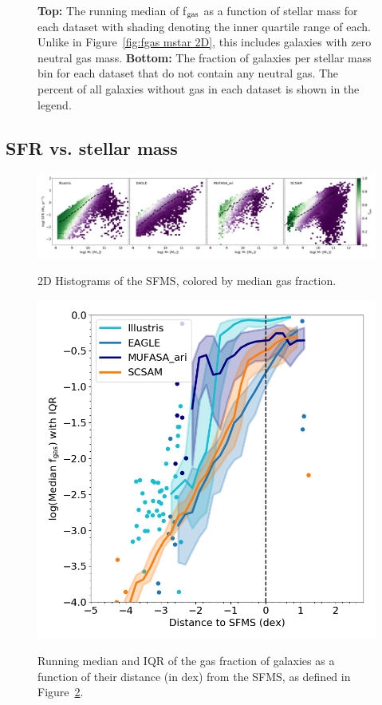 \documentclass[fleqn,usenatbib]{mnras}
\begin{document}
\begin{figure}
\caption{{\bf Top:} The running median of f$_{\rm gas}$ as a function of stellar mass for each dataset with shading denoting the inner quartile range of each. Unlike in Figure~\ref{fig:fgas mstar 2D}, this includes galaxies with zero neutral gas mass. {\bf Bottom:} The fraction of galaxies per stellar mass bin for each dataset that do not contain any neutral gas. The percent of all galaxies without gas in each dataset is shown in the legend.}
\label{fig:linear fgas mstar}
\end{figure}

\subsection{SFR vs. stellar mass}
\label{sec:results:SFMS fgas}


\begin{figure}
\includegraphics[width = 0.99\linewidth]{SFMS_fits_2dhist_median.png}\\
\caption{2D Histograms of the SFMS, colored by median gas fraction. }
\label{fig:SFMS fgas}
\end{figure}


\begin{figure}
\includegraphics[width = 0.99\linewidth]{fgas_DSFMS_binned_IQR_logged.png}\\
\caption{Running median and IQR of the gas fraction of galaxies as a function of their distance (in dex) from the SFMS, as defined in Figure~\ref{fig:SFMS fgas}.}
\label{fig:fgas DSFMS}
\end{figure}
\end{document}

